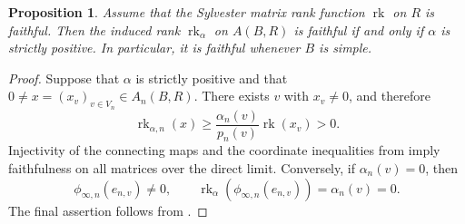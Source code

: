 \documentclass[11pt]{amsart}
\DeclareMathOperator{\rk}{rk}
\newtheorem{proposition}[theorem]{Proposition}
\theoremstyle{definition}
\theoremstyle{remark}
\begin{document}
\begin{proposition}\label{prop:weighted-rank-faithful}
Assume that the Sylvester matrix rank function $\rk$ on $R$ is faithful.
Then the induced rank $\rk_\alpha$ on $A(B,R)$ is faithful if and only if
$\alpha$ is strictly positive.
In particular, it is faithful whenever $B$ is simple.
\end{proposition}

\begin{proof}
Suppose that $\alpha$ is strictly positive and that $0\neq x=(x_v)_{v\in
V_n}\in A_n(B,R)$.
There exists $v$ with $x_v\neq0$, and therefore
\[
  \rk_{\alpha,n}(x)
  \geq \frac{\alpha_n(v)}{p_n(v)}\rk(x_v)>0.
\]
Injectivity of the connecting maps and the coordinate inequalities
from  imply faithfulness on all matrices
over the direct limit.
Conversely, if $\alpha_n(v)=0$, then
\[
 \phi_{\infty,n}(e_{n,v})\neq0,\qquad
 \rk_\alpha(\phi_{\infty,n}(e_{n,v}))=\alpha_n(v)=0.
\]
The final assertion follows from .
\end{proof}
\end{document}
